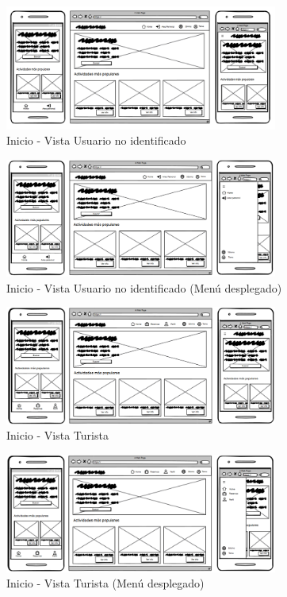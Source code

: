 \begin{figure}[H]
	\centering
	\includegraphics[width=0.8\textwidth]{5-AnalisisDelSistemaDeInformacion/InterfacesDeUsuario/Inicio/inicio-no-identificado.png}
	\caption{Inicio - Vista Usuario no identificado }
\end{figure}

\begin{figure}[H]
	\centering
	\includegraphics[width=0.8\textwidth]{5-AnalisisDelSistemaDeInformacion/InterfacesDeUsuario/Inicio/inicio-no-identificado-menu.png}
	\caption{Inicio - Vista Usuario no identificado (Menú desplegado)}
\end{figure}

\begin{figure}[H]
	\centering
	\includegraphics[width=0.8\textwidth]{5-AnalisisDelSistemaDeInformacion/InterfacesDeUsuario/Inicio/inicio-turista.png}
	\caption{Inicio - Vista Turista }
\end{figure}

\begin{figure}[H]
	\centering
	\includegraphics[width=0.8\textwidth]{5-AnalisisDelSistemaDeInformacion/InterfacesDeUsuario/Inicio/inicio-turista-menu.png}
	\caption{Inicio - Vista Turista (Menú desplegado)}
\end{figure}
